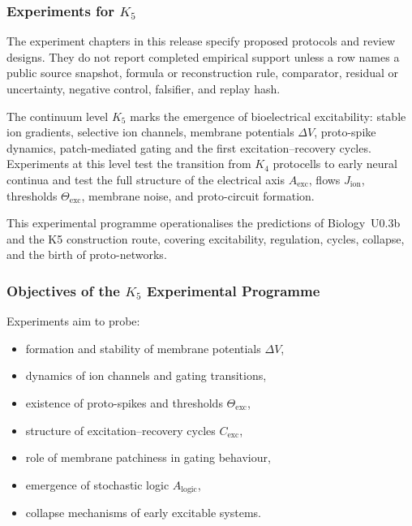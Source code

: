 
\subsubsection{Experiments for \texorpdfstring{$K_5$}{K5}}

The experiment chapters in this release specify proposed protocols and review designs. They do not report completed empirical support unless a row names a public source snapshot, formula or reconstruction rule, comparator, residual or uncertainty, negative control, falsifier, and replay hash.
\label{sec:experiments-k5}

The continuum level $K_5$ marks the emergence of
bioelectrical excitability: stable ion gradients,
selective ion channels, membrane potentials $\Delta V$,
proto-spike dynamics, patch-mediated gating and the
first excitation--recovery cycles.
Experiments at this level test the transition from $K_4$ protocells
to early neural continua and test the full structure of
the electrical axis $A_{\mathrm{exc}}$, flows $J_{\mathrm{ion}}$,
thresholds $\Theta_{\mathrm{exc}}$, membrane noise,
and proto-circuit formation.

This experimental programme operationalises the predictions of
Biology~U0.3b and the K5 construction route, covering excitability, regulation,
cycles, collapse, and the birth of proto-networks.



\subsubsection{Objectives of the \texorpdfstring{$K_5$}{K5} Experimental Programme}

Experiments aim to probe:

\begin{itemize}
    \item formation and stability of membrane potentials $\Delta V$,
    \item dynamics of ion channels and gating transitions,
    \item existence of proto-spikes and thresholds $\Theta_{\mathrm{exc}}$,
    \item structure of excitation--recovery cycles $C_{\mathrm{exc}}$,
    \item role of membrane patchiness in gating behaviour,
    \item emergence of stochastic logic $A_{\mathrm{logic}}$,
    \item collapse mechanisms of early excitable systems.
\end{itemize}



